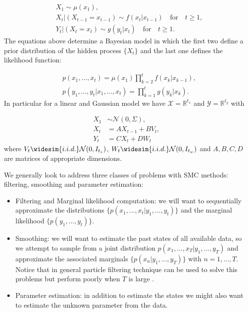 \documentclass[11pt,a4paper]{article}
\begin{document}
\begin{align*}
    & X_1 \sim \mu(x_1), \nonumber \\
    & X_t | (X_{t-1} = x_{t-1}) \sim f(x_t | x_{t-1}) \quad \text{for} \quad t\geq 1, \label{eq:1X_t} \\ 
    & Y_t | (X_t = x_t) \sim g(y_t | x_t) \quad \text{for} \quad t\geq 1. \label{eq:1Y_t}
\end{align*}
The equations above determine a Bayesian model in which the first two define a prior distribution of the hidden process $\{ X_t \}$ and the last one defines the likelihood function:

\begin{align*}
    & p(x_1, \dots, x_t) = \mu(x_1) \prod_{k=2}^t f(x_k | x_{k-1}), \\
    & p(y_1, \dots, y_t | x_1, \dots, x_t) = \prod_{k=1}^t g(y_k | x_k).
\end{align*}
In particular for a linear and Gaussian model we have $\mathcal{X} = \mathbb{R}^{t_x}$ and $\mathcal{Y} = \mathbb{R}^{t_y}$ with

\begin{align*}
    X_1 &\sim \mathcal{N}(0, \Sigma),\\
    X_t & = A X_{t-1} + B V_t, \\
    Y_t & = C X_t + D W_t
\end{align*}
where $V_t \widesim{i.i.d.} \mathcal{N}(0, I_{t_v})$, $W_t \widesim{i.i.d.} \mathcal{N}(0, I_{t_w})$ and $A, B, C, D$ are matrices of appropriate dimensions. 

We generally look to address three classes of problems with SMC methods: filtering, smoothing and parameter estimation:

\begin{itemize}
    \item Filtering and Marginal likelihood computation: we will want to sequentially approximate the distributions $\{ p(x_1, \dots, x_t | y_1, \dots, y_t) \}$ and the marginal likelihood $\{ p(y_1, \dots, y_t) \}$.
    \item Smoothing: we will want to estimate the past states of all available data, so we attempt to sample from a joint distribution $p(x_1, \dots, x_T | y_1, \dots, y_T)$ and approximate the associated marginals $\{ p(x_n | y_1, \dots, y_T)\}$ with $n = 1, \dots, T$. Notice that in general particle filtering technique can be used to solve this problems but perform poorly when $T$ is large \cite{DoucetTutorial}.
    \item Parameter estimation: in addition to estimate the states we might also want to estimate the unknown parameter from the data.
\end{itemize}
\end{document}
